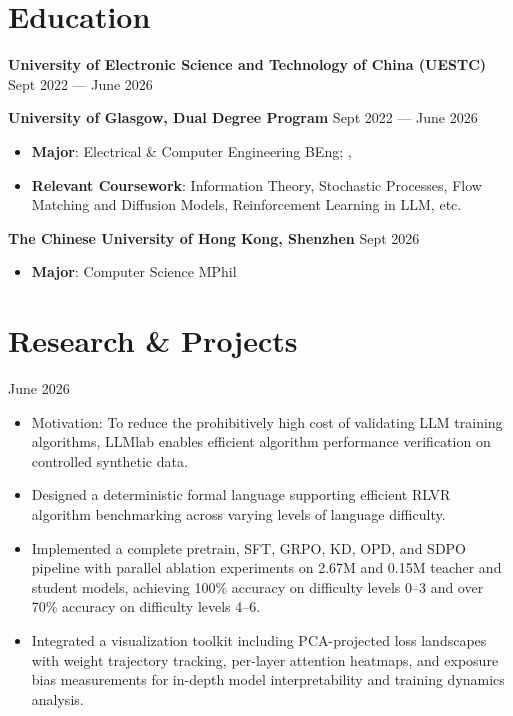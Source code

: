 \section{Education}

\textbf{University of Electronic Science and Technology of China (UESTC)} \hfill Sept 2022 --- June 2026

\textbf{University of Glasgow, Dual Degree Program} \hfill Sept 2022 --- June 2026

\begin{itemize}
    \item \textbf{Major}: Electrical \& Computer Engineering BEng; , 
    \item \textbf{Relevant Coursework}: Information Theory, Stochastic Processes, Flow Matching and Diffusion Models, Reinforcement Learning in LLM, etc.
\end{itemize}

\textbf{The Chinese University of Hong Kong, Shenzhen} \hfill Sept 2026

\begin{itemize}
    \item \textbf{Major}: Computer Science MPhil
\end{itemize}


\section{Research \& Projects}

 \hfill June 2026

\begin{itemize}
    \item Motivation: To reduce the prohibitively high cost of validating LLM training algorithms, LLMlab enables efficient algorithm performance verification on controlled synthetic data.
    \item Designed a deterministic formal language supporting efficient RLVR algorithm benchmarking across varying levels of language difficulty.
    \item Implemented a complete pretrain, SFT, GRPO, KD, OPD, and SDPO pipeline with parallel ablation experiments on 2.67M and 0.15M teacher and student models, achieving 100\% accuracy on difficulty levels 0--3 and over 70\% accuracy on difficulty levels 4--6.
    \item Integrated a visualization toolkit including PCA-projected loss landscapes with weight trajectory tracking, per-layer attention heatmaps, and exposure bias measurements for in-depth model interpretability and training dynamics analysis.
\end{itemize}

